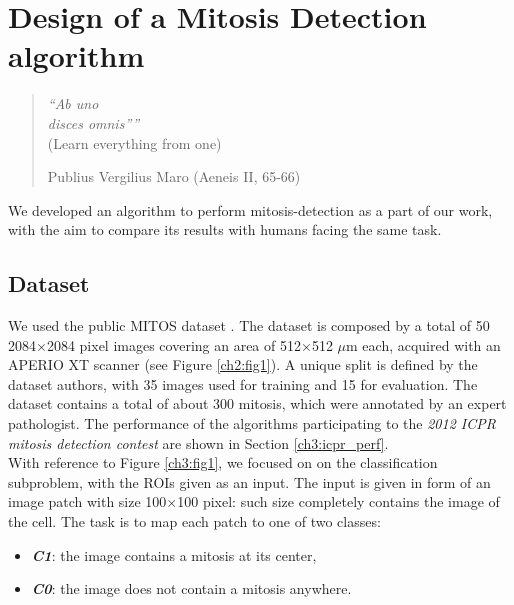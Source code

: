 \chapter{Design of a Mitosis Detection algorithm}
\label{chapter4}
\thispagestyle{empty}

\begin{quotation}
{\footnotesize
\noindent \emph{\textquotedblleft Ab uno\\ disces omnis\textquotedblright''}\\
\noindent (Learn everything from one)
\begin{flushright}
Publius Vergilius Maro (Aeneis II, 65-66)
\end{flushright}
}
\end{quotation}

\vspace{0.5cm}


We developed an algorithm to perform mitosis-detection as a part of our work, with the aim to compare its results with humans facing the same task.

\section{Dataset}
\label{ch4:ds}

We used the public MITOS dataset \cite{icpr}. The dataset is composed by a total of 50 2084$\times$2084 pixel images
covering an area of 512$\times$512 $\mu$m each, acquired with an APERIO XT scanner (see Figure \ref{ch2:fig1}). 
A unique split is defined by the dataset authors, with 35 images used for training and 15 for evaluation.
The dataset contains a total of about 300 mitosis, which were annotated by an expert pathologist.
The performance of the algorithms participating to the \textit{2012 ICPR mitosis detection contest} are shown in Section \ref{ch3:icpr_perf}.\\
With reference to Figure \ref{ch3:fig1}, we focused on on the classification subproblem, with the \Glspl{ROI} given as an input.
The input is given in form of an image patch with size 100$\times$100 pixel: such size completely contains the image of the cell.
The task is to map each patch to one of two classes:
\begin{itemize}
 \item [] \textit{\textbf{C1}}: the image contains a mitosis at its center,
 \item [] \textit{\textbf{C0}}: the image does not contain a mitosis anywhere. 
\end{itemize}

